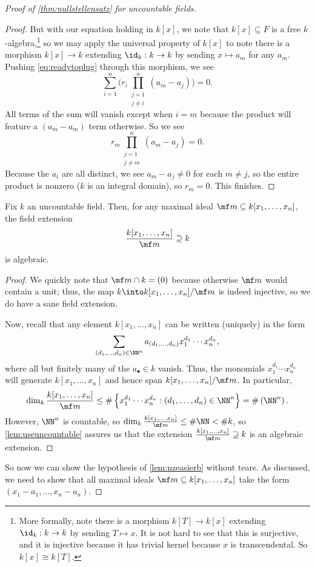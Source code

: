 \documentclass[../notes.tex]{subfiles}
\begin{document}
\begin{proof}[Proof of \autoref{thm:nullstellensatz} for uncountable fields]
\begin{proof}
		But with our equation holding in $k[x]$, we note that $k[x]\subseteq F$ is a free $k$-algebra,\footnote{More formally, note there is a morphism $k[T]\to k[x]$ extending $\id_k:k\to k$ by sending $T\mapsto x$. It is not hard to see that this is surjective, and it is injective because it has trivial kernel because $x$ is transcendental. So $k[x]\cong k[T]$.} so we may apply the universal property of $k[x]$ to note there is a morphism $k[x]\to k$ extending $\id_k:k\to k$ by sending $x\mapsto a_m$ for any $a_m$. Pushing \autoref{eq:readytoplug} through this morphism, we see
		\[\sum_{i=1}^n\Bigg(r_i\prod_{\substack{j=1\\j\ne i}}^n(a_m-a_j)\Bigg)=0.\]
		All terms of the sum will vanish except when $i=m$ because the product will feature a $(a_m-a_m)$ term otherwise. So we see
		\[r_m\prod_{\substack{j=1\\j\ne m}}^n(a_m-a_j)=0.\]
		Because the $a_i$ are all distinct, we see $a_m-a_j\ne0$ for each $m\ne j$, so the entire product is nonzero ($k$ is an integral domain), so $r_m=0$. This finishes.
	\end{proof}
	\begin{corollary} \label{cor:forcealgebraic}
		Fix $k$ an uncountable field. Then, for any maximal ideal $\mf m\subseteq k[x_1,\ldots,x_n]$, the field extension
		\[\frac{k[x_1,\ldots,x_n]}{\mf m}\supseteq k\]
		is algebraic.
	\end{corollary}
	\begin{proof}
		We quickly note that $\mf m\cap k=(0)$ because otherwise $\mf m$ would contain a unit; thus, the map $k\into k[x_1,\ldots,x_n]/\mf m$ is indeed injective, so we do have a sane field extension.
		
		Now, recall that any element $k[x_1,\ldots,x_n]$ can be written (uniquely) in the form
		\[\sum_{(d_1,\ldots,d_n)\in\NN^n}a_{(d_1,\ldots,d_n)}x_1^{d_1}\cdots x_n^{d_n},\]
		where all but finitely many of the $a_\bullet\in k$ vanish. Thus, the monomials $x_1^{d_1}\cdots x_n^{d_n}$ will generate $k[x_1,\ldots,x_n]$ and hence span $k[x_1,\ldots,x_n]/\mf m$. In particular,
		\[\dim_k\frac{k[x_1,\ldots,x_n]}{\mf m}\le\#\left\{x_1^{d_1}\cdots x_n^{d_n}:(d_1,\ldots,d_n)\in\NN^n\right\}=\#\left(\NN^n\right).\]
		However, $\NN^n$ is countable, so $\dim_k\frac{k[x_1,\ldots,x_n]}{\mf m}\le\#\NN<\#k$, so \autoref{lem:useuncountable} assures us that the extension $\frac{k[x_1,\ldots,x_n]}{\mf m}\supseteq k$ is an algebraic extension.
	\end{proof}
	So now we can show the hypothesis of \autoref{lem:nzeasierb} without tears. As discussed, we need to show that all maximal ideals $\mf m\subseteq k[x_1,\ldots,x_n]$ take the form $(x_1-a_1,\ldots,x_n-a_n)$.
	

\end{proof}
\end{document}
